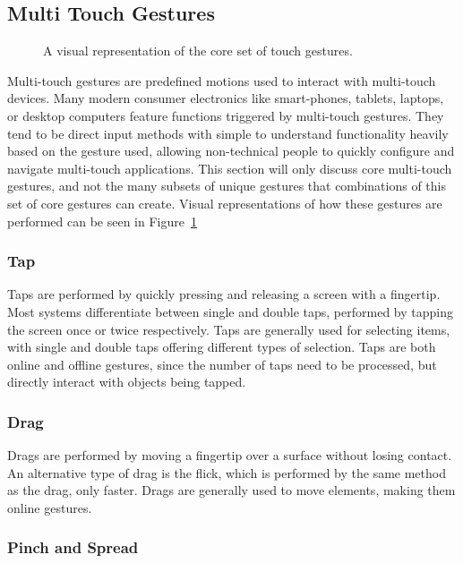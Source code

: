\subsection{Multi Touch Gestures}
\begin{figure}
\caption[The core set of gestures]{A visual representation of the core set of touch gestures. \cite{touchreference} } 
\label{fig:touchgestures}
\end{figure}

Multi-touch gestures are predefined motions used to interact with multi-touch devices.
Many modern consumer electronics like smart-phones, tablets, laptops, or desktop computers feature functions triggered by multi-touch gestures.
They tend to be direct input methods with simple to understand functionality heavily based on the gesture used, allowing non-technical people to quickly configure and navigate multi-touch applications.
This section will only discuss core multi-touch gestures, and not the many subsets of unique gestures that combinations of this set of core gestures can create. Visual representations of how these gestures are performed can be seen in Figure~\ref{fig:touchgestures}

\subsubsection{Tap}

Taps are performed by quickly pressing and releasing a screen with a fingertip. 
Most systems differentiate between single and double taps, performed by tapping the screen once or twice respectively.
Taps are generally used for selecting items, with single and double taps offering different types of selection.
Taps are both online and offline gestures, since the number of taps need to be processed, but directly interact with objects being tapped.

\subsubsection{Drag}

Drags are performed by moving a fingertip over a surface without losing contact. 
An alternative type of drag is the flick, which is performed by the same method as the drag, only faster.
Drags are generally used to move elements, making them online gestures.

\subsubsection{Pinch and Spread}

